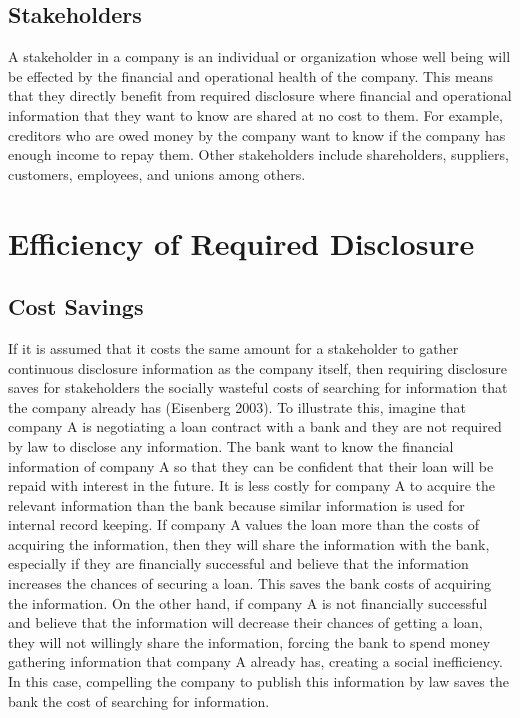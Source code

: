 \documentclass[
  12pt,
  letterpaper,
  DIV=11,
  numbers=noendperiod]{scrartcl}
\begin{document}
\hypertarget{stakeholders}{%
\subsection{Stakeholders}\label{stakeholders}}

A stakeholder in a company is an individual or organization whose well
being will be effected by the financial and operational health of the
company. This means that they directly benefit from required disclosure
where financial and operational information that they want to know are
shared at no cost to them. For example, creditors who are owed money by
the company want to know if the company has enough income to repay them.
Other stakeholders include shareholders, suppliers, customers,
employees, and unions among others.

\hypertarget{efficiency-of-required-disclosure}{%
\section{Efficiency of Required
Disclosure}\label{efficiency-of-required-disclosure}}

\hypertarget{cost-savings}{%
\subsection{Cost Savings}\label{cost-savings}}

If it is assumed that it costs the same amount for a stakeholder to
gather continuous disclosure information as the company itself, then
requiring disclosure saves for stakeholders the socially wasteful costs
of searching for information that the company already has (Eisenberg
2003). To illustrate this, imagine that company A is negotiating a loan
contract with a bank and they are not required by law to disclose any
information. The bank want to know the financial information of company
A so that they can be confident that their loan will be repaid with
interest in the future. It is less costly for company A to acquire the
relevant information than the bank because similar information is used
for internal record keeping. If company A values the loan more than the
costs of acquiring the information, then they will share the information
with the bank, especially if they are financially successful and believe
that the information increases the chances of securing a loan. This
saves the bank costs of acquiring the information. On the other hand, if
company A is not financially successful and believe that the information
will decrease their chances of getting a loan, they will not willingly
share the information, forcing the bank to spend money gathering
information that company A already has, creating a social inefficiency.
In this case, compelling the company to publish this information by law
saves the bank the cost of searching for information.
\end{document}
